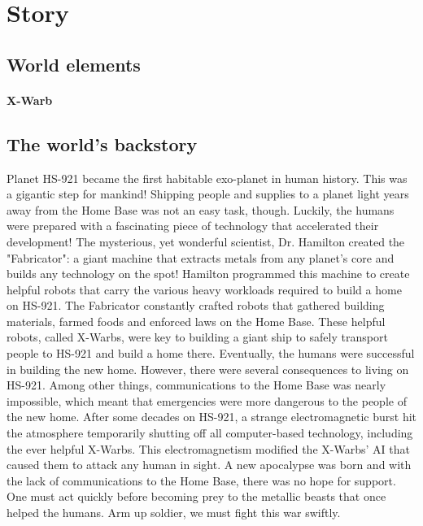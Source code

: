 \documentclass[../Main.tex]{subfiles}
\begin{document}
\section{Story}

\subsection{World elements}

\paragraph{X-Warb} 


\subsection{The world's backstory}

Planet HS-921 became the first habitable exo-planet in human history. This was a gigantic step for mankind! Shipping people and supplies to a planet light years away from the Home Base was not an easy task, though. Luckily, the humans were prepared with a fascinating piece of technology that accelerated their development! The mysterious, yet wonderful scientist, Dr. Hamilton created the "Fabricator": a giant machine that extracts metals from any planet's core and builds any technology on the spot! Hamilton programmed this machine to create helpful robots that carry the various heavy workloads required to build a home on HS-921. The Fabricator constantly crafted robots that gathered building materials, farmed foods and enforced laws on the Home Base. These helpful robots, called X-Warbs, were key to building a giant ship to safely transport people to HS-921 and build a home there. Eventually, the humans were successful in building the new home. However, there were several consequences to living on HS-921. Among other things, communications to the Home Base was nearly impossible, which meant that emergencies were more dangerous to the people of the new home. After some decades on HS-921, a strange electromagnetic burst hit the atmosphere temporarily shutting off all computer-based technology, including the ever helpful X-Warbs. This electromagnetism modified the X-Warbs' AI that caused them to attack any human in sight. A new apocalypse was born and with the lack of communications to the Home Base, there was no hope for support. One must act quickly before becoming prey to the metallic beasts that once helped the humans. Arm up soldier, we must fight this war swiftly. 
\end{document}
